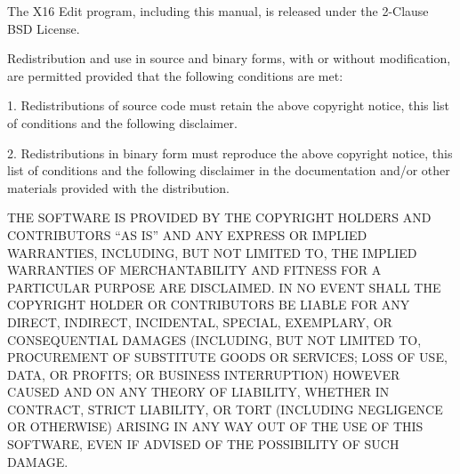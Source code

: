\documentclass{article}
\begin{document}
	The X16 Edit program, including this manual, is released under the 2-Clause BSD
    License.
    
    Redistribution and use in source and binary forms, with or without modification, 
    are permitted provided that the following conditions are met:

    1. Redistributions of source code must retain the above copyright notice, this 
       list of conditions and the following disclaimer.

    2. Redistributions in binary form must reproduce the above copyright notice, 
       this list of conditions and the following disclaimer in the documentation 
       and/or other materials provided with the distribution.

    THE SOFTWARE IS PROVIDED BY THE COPYRIGHT HOLDERS AND CONTRIBUTORS “AS IS” 
    AND ANY EXPRESS OR IMPLIED WARRANTIES, INCLUDING, BUT NOT LIMITED TO, THE 
    IMPLIED WARRANTIES OF MERCHANTABILITY AND FITNESS FOR A PARTICULAR PURPOSE ARE 
    DISCLAIMED. IN NO EVENT SHALL THE COPYRIGHT HOLDER OR CONTRIBUTORS BE LIABLE 
    FOR ANY DIRECT, INDIRECT, INCIDENTAL, SPECIAL, EXEMPLARY, OR CONSEQUENTIAL 
    DAMAGES (INCLUDING, BUT NOT LIMITED TO, PROCUREMENT OF SUBSTITUTE GOODS OR 
    SERVICES; LOSS OF USE, DATA, OR PROFITS; OR BUSINESS INTERRUPTION) HOWEVER 
    CAUSED AND ON ANY THEORY OF LIABILITY, WHETHER IN CONTRACT, STRICT LIABILITY, 
    OR TORT (INCLUDING NEGLIGENCE OR OTHERWISE) ARISING IN ANY WAY OUT OF THE USE 
    OF THIS SOFTWARE, EVEN IF ADVISED OF THE POSSIBILITY OF SUCH DAMAGE.
\end{document}

